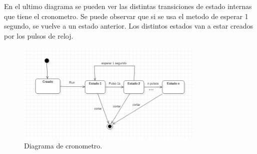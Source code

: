 \documentclass[titlepage,a4paper]{article}
\begin{document}
En el ultimo diagrama se pueden  ver las distintas transiciones de estado internas que tiene el cronometro. Se puede observar que si se usa el metodo de esperar 1 segundo, se vuelve a un estado anterior. Los distintos estados van a estar creados por los pulsos de reloj.

\begin{figure}[H]
    \centering
    \includegraphics[width=0.8\textwidth]{DiagramaDeEstadoCronometro.png}
    \caption{\label{fig:class05}Diagrama de cronometro.}
\end{figure}
\end{document}
